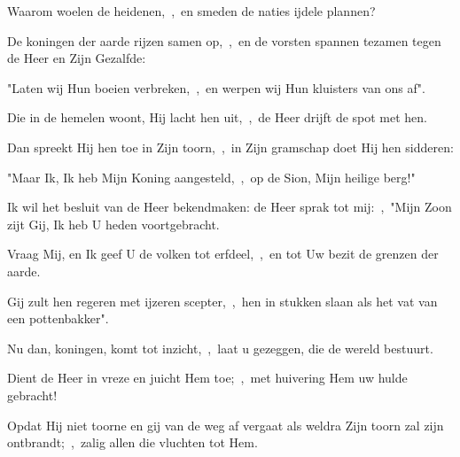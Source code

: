 \documentclass[12pt,twoside,a5paper]{article}
\begin{document}


\begin{halfparskip}
  Waarom woelen de heidenen,~\sep\ en smeden de naties ijdele plannen?


  De koningen der aarde rijzen samen op,~\sep\ en de vorsten spannen tezamen tegen de Heer en Zijn Gezalfde:

  "Laten wij Hun boeien verbreken,~\sep\ en werpen wij Hun kluisters van ons af".
\end{halfparskip}


\begin{halfparskip}
  Die in de hemelen woont, Hij lacht hen uit,~\sep\ de Heer drijft de spot met hen.

  Dan spreekt Hij hen toe in Zijn toorn,~\sep\ in Zijn gramschap doet Hij hen sidderen:

  "Maar Ik, Ik heb Mijn Koning aangesteld,~\sep\ op de Sion, Mijn heilige berg!"
\end{halfparskip}


\begin{halfparskip}
  Ik wil het besluit van de Heer bekendmaken: de Heer sprak tot mij:~\sep\ "Mijn Zoon zijt Gij, Ik heb U heden voortgebracht.

  Vraag Mij, en Ik geef U de volken tot erfdeel,~\sep\ en tot Uw bezit de grenzen der aarde.

  Gij zult hen regeren met ijzeren scepter,~\sep\ hen in stukken slaan als het vat van een pottenbakker".
\end{halfparskip}


\begin{halfparskip}
  Nu dan, koningen, komt tot inzicht,~\sep\ laat u gezeggen, die de wereld bestuurt.

  Dient de Heer in vreze en juicht Hem toe;~\sep\ met huivering Hem uw hulde gebracht!

  Opdat Hij niet toorne en gij van de weg af vergaat als weldra Zijn toorn zal zijn ontbrandt;~\sep\ zalig allen die vluchten tot Hem.
\end{halfparskip}
\end{document}
